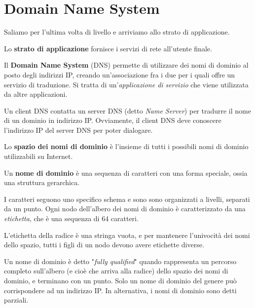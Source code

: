 \section{Domain Name System}

    Saliamo per l'ultima volta di livello e arriviamo allo strato di applicazione.
    
    \vspace{3mm}
    
    Lo \textbf{strato di applicazione} fornisce i servizi di rete all'utente finale.
    
    \vspace{3mm}
    
    Il \textbf{Domain Name System} (DNS) permette di utilizzare dei nomi di dominio al posto degli indirizzi IP, creando un'associazione fra i due per i quali offre un servizio di traduzione. Si tratta di un'\textit{applicazione di servizio} che viene utilizzata da altre applicazioni.
    
    Un client DNS contatta un server DNS (detto \textit{Name Server}) per tradurre il nome di un dominio in indirizzo IP. Ovviamente, il client DNS deve conoscere l'indirizzo IP del server DNS per poter dialogare.
    
    \vspace{3mm}
    
    Lo \textbf{spazio dei nomi di dominio} è l'insieme di tutti i possibili nomi di dominio utilizzabili su Internet. 
    
    Un \textbf{nome di dominio} è una sequenza di caratteri con una forma speciale, ossia una struttura gerarchica. 
    
    \vspace{3mm}
    
    I caratteri seguono uno specifico schema e sono sono organizzati a livelli, separati da un punto. Ogni nodo dell'albero dei nomi di dominio è caratterizzato da una \textit{etichetta}, che è una sequenza di 64 caratteri. 
    
    \vspace{3mm}
    
    L'etichetta della radice è una stringa vuota, e per mantenere l'univocità dei nomi dello spazio, tutti i figli di un nodo devono avere etichette diverse. 
    
    \vspace{3mm}
    
    Un nome di dominio è detto "\textit{fully qualified}" quando rappresenta un percorso completo sull'albero (e cioè che arriva alla radice) dello spazio dei nomi di dominio, e terminano con un punto. Solo un nome di dominio del genere può corrispondere ad un indirizzo IP. In alternativa, i nomi di dominio sono detti parziali.
    
